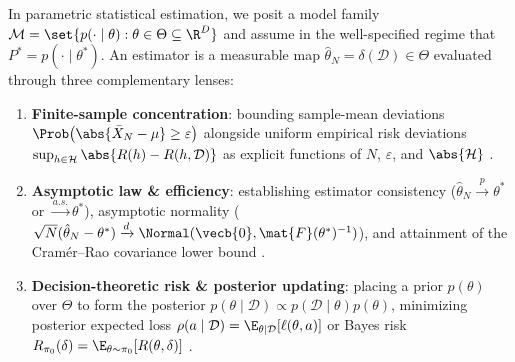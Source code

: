 \documentclass[../../../../master.tex]{subfiles}
\begin{document}
In parametric statistical estimation, we posit a model family $\mathcal{M} = \set{p(\cdot \mid \theta) : \theta \in \Theta \subseteq \R^D}$ and assume in the well-specified regime that $P^* = p(\cdot \mid \theta^*)$. An estimator is a measurable map $\hat{\theta}_N = \delta(\mathcal{D}) \in \Theta$ evaluated through three complementary lenses:
\begin{enumerate}
  \item \textbf{Finite-sample concentration}: bounding sample-mean deviations $\Prob\bigl(\abs{\bar{X}_N - \mu} \ge \varepsilon\bigr)$  alongside uniform empirical risk deviations $\sup_{h \in \mathcal{H}} \abs{R(h) - R(h, \mathcal{D})}$ as explicit functions of $N$, $\varepsilon$, and $\abs{\mathcal{H}}$ .
  \item \textbf{Asymptotic law \& efficiency}: establishing estimator consistency ($\hat{\theta}_N \xrightarrow{p} \theta^*$ or $\xrightarrow{a.s.} \theta^*$), asymptotic normality ($\sqrt{N}(\hat{\theta}_N - \theta^*) \xrightarrow{d} \Normal(\vecb{0}, \mat{F}(\theta^*)^{-1})$), and attainment of the Cram\'er--Rao covariance lower bound  .
  \item \textbf{Decision-theoretic risk \& posterior updating}: placing a prior $p(\theta)$ over $\Theta$ to form the posterior $p(\theta \mid \mathcal{D}) \propto p(\mathcal{D} \mid \theta) p(\theta)$, minimizing posterior expected loss $\rho(a \mid \mathcal{D}) = \E_{\theta \mid \mathcal{D}}[\ell(\theta, a)]$ or Bayes risk $R_{\pi_0}(\delta) = \E_{\theta \sim \pi_0}[R(\theta, \delta)]$  .
\end{enumerate}
\end{document}
